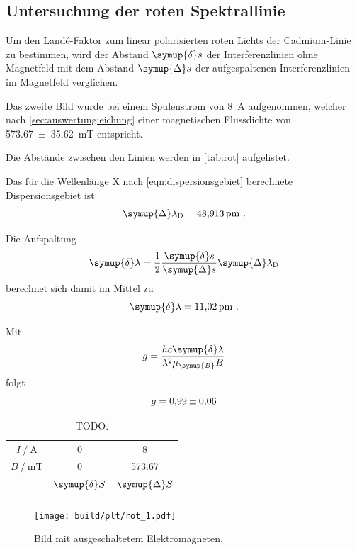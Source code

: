 \subsection{Untersuchung der roten Spektrallinie}
Um den Landé-Faktor zum linear polarisierten roten Lichts der Cadmium-Linie zu bestimmen,
wird der Abstand $\symup{\delta} s$ der Interferenzlinien ohne Magnetfeld
mit dem Abstand $\symup{\Delta} s$ der aufgespaltenen Interferenzlinien im Magnetfeld verglichen.


Das zweite Bild wurde bei einem Spulenstrom von \SI{8}{\ampere} aufgenommen,
welcher nach \autoref{sec:auswertung:eichung} einer magnetischen Flussdichte von \SI{573.67 \pm 35.62}{\milli\tesla} entspricht.

Die Abstände zwischen den Linien werden in \autoref{tab:rot} aufgelistet.

Das für die Wellenlänge X nach \autoref{eqn:dispersionsgebiet} berechnete Dispersionsgebiet ist
\[
    \symup{\Delta}\lambda_\text{D} = \SI{48.913}{\pico\meter} \ .
\]

Die Aufspaltung
\[
    \symup{\delta} \lambda = \frac{1}{2} \frac{\symup{\delta} s}{\symup{\Delta} s} \symup{\Delta} \lambda_\text{D}
\]
berechnet sich damit im Mittel zu
\[
    \symup{\delta} \lambda = \SI{11.02}{\pico\meter} \ .
\]

Mit
\[
    g = \frac{hc \symup{\delta} \lambda}{\lambda^2 \mu_{\symup{B}} B}
\]
folgt
\[
    g = \num{0.99 \pm 0.06}
\]


\begin{table}
    \centering
    \caption{TODO.}
    \label{tab:rot}
    \begin{tabular}{S S S}
        \toprule
        {$I \mathbin{/} \si{\ampere}$} & 0 & 8 \\
        {$B \mathbin{/} \si{\milli\tesla}$} & 0 & 573.67  \\
        \midrule
        & {$\symup{\delta} S$} & {$\symup{\Delta} S$} \\ %
        \midrule
        \bottomrule
    \end{tabular}
\end{table}

\begin{figure}
    \centering
    \texttt{[image: build/plt/rot\_1.pdf]}
    \caption{Bild mit ausgeschaltetem Elektromagneten.}
    \label{fig:plt:rot_1}
\end{figure}

